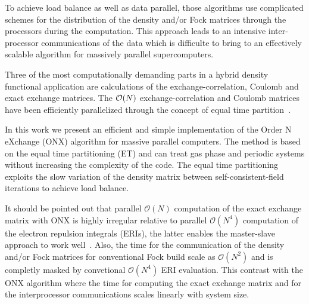 \documentclass[prl,twocolumn,showpacs,twocolumngrid,superbib]{revtex4}
\begin{document}
 To achieve load balance as well as data parallel, 
 those algorithms use complicated schemes for the 
 distribution of the density and/or Fock 
 matrices through the processors during the computation.
 This approach leads to an intensive inter-processor 
 communications of the data which is difficulte to bring to an 
 effectively scalable algorithm for massively parallel supercomputers. 





 Three of the most computationally demanding parts in a 
 hybrid density functional application are calculations
 of the exchange-correlation, Coulomb and exact exchange 
 matrices. The ${\cal O}(N)$ exchange-correlation and Coulomb matrices
 have been efficiently parallelized through the concept of equal time
 partition~\cite{CGan03,CGan04B}.

 In this work we present an efficient and simple implementation 
 of the Order N eXchange (ONX) algorithm for massive parallel computers. The method
 is based on the equal time partitioning (ET) and can treat gas phase and periodic systems 
 without increasing the complexity of the code. The equal time partitioning exploits 
 the slow variation of the density matrix between self-consistent-field iterations
 to achieve load balance.
 
 It should be pointed out that parallel $\mathcal{O}(N)$ computation
 of the exact exchange matrix with ONX is highly irregular relative 
 to parallel $\mathcal{O}(N^4)$ computation of the electron repulsion integrals (ERIs), 
 the latter enables the master-slave approach to work well~\cite{RHarrison96}.
 Also, the time for the communication of the density and/or Fock matrices for conventional Fock build
 scale as $\mathcal{O}(N^2)$ and is completly masked by convetional $\mathcal{O}(N^4)$ ERI evaluation.
 This contrast with the ONX algorithm where the time for computing the exact 
 exchange matrix and for the interprocessor communications scales linearly with system size.
\end{document}
